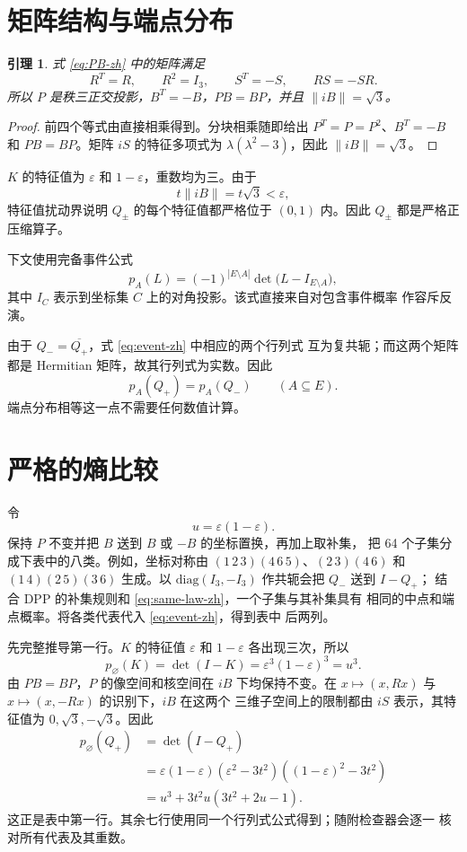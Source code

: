 \documentclass[UTF8,11pt,a4paper]{ctexart}
\newtheorem{lemma}{引理}
\begin{document}
\section{矩阵结构与端点分布}

\begin{lemma}\label{lem:structure-zh}
式 \eqref{eq:PB-zh} 中的矩阵满足
\[
 R^T=R,\qquad R^2=I_3,\qquad
 S^T=-S,\qquad RS=-SR.
\]
所以 $P$ 是秩三正交投影，$B^T=-B$，$PB=BP$，并且
$\lVert iB\rVert=\sqrt3$。
\end{lemma}

\begin{proof}
前四个等式由直接相乘得到。分块相乘随即给出
$P^T=P=P^2$、$B^T=-B$ 和 $PB=BP$。矩阵 $iS$ 的特征多项式为
$\lambda(\lambda^2-3)$，因此 $\lVert iB\rVert=\sqrt3$。
\end{proof}

$K$ 的特征值为 $\varepsilon$ 和 $1-\varepsilon$，重数均为三。由于
\[
 t\lVert iB\rVert=t\sqrt3<\varepsilon,
\]
特征值扰动界说明 $Q_\pm$ 的每个特征值都严格位于 $(0,1)$ 内。因此
$Q_\pm$ 都是严格正压缩算子。

下文使用完备事件公式
\begin{equation}\label{eq:event-zh}
 p_A(L)=(-1)^{|E\setminus A|}
 \det\bigl(L-I_{E\setminus A}\bigr),
\end{equation}
其中 $I_C$ 表示到坐标集 $C$ 上的对角投影。该式直接来自对包含事件概率
作容斥反演。

由于 $Q_-=\overline{Q_+}$，式 \eqref{eq:event-zh} 中相应的两个行列式
互为复共轭；而这两个矩阵都是 Hermitian 矩阵，故其行列式为实数。因此
\begin{equation}\label{eq:same-law-zh}
 p_A(Q_+)=p_A(Q_-)\qquad(A\subseteq E).
\end{equation}
端点分布相等这一点不需要任何数值计算。

\section{严格的熵比较}

令
\[
 u=\varepsilon(1-\varepsilon).
\]
保持 $P$ 不变并把 $B$ 送到 $B$ 或 $-B$ 的坐标置换，再加上取补集，
把 64 个子集分成下表中的八类。例如，坐标对称由
$(1\,2\,3)(4\,6\,5)$、$(2\,3)(4\,6)$ 和
$(1\,4)(2\,5)(3\,6)$ 生成。以
$\mathrm{diag}(I_3,-I_3)$ 作共轭会把 $Q_-$ 送到 $I-Q_+$；
结合 DPP 的补集规则和 \eqref{eq:same-law-zh}，一个子集与其补集具有
相同的中点和端点概率。将各类代表代入 \eqref{eq:event-zh}，得到表中
后两列。

先完整推导第一行。$K$ 的特征值 $\varepsilon$ 和 $1-\varepsilon$
各出现三次，所以
\[
 p_{\varnothing}(K)=\det(I-K)
 =\varepsilon^3(1-\varepsilon)^3=u^3.
\]
由 $PB=BP$，$P$ 的像空间和核空间在 $iB$ 下均保持不变。在
$x\mapsto(x,Rx)$ 与 $x\mapsto(x,-Rx)$ 的识别下，$iB$ 在这两个
三维子空间上的限制都由 $iS$ 表示，其特征值为
$0,\sqrt3,-\sqrt3$。因此
\begin{align*}
 p_{\varnothing}(Q_+)
 &=\det(I-Q_+)\\
 &=\varepsilon(1-\varepsilon)
   (\varepsilon^2-3t^2)((1-\varepsilon)^2-3t^2)\\
 &=u^3+3t^2u(3t^2+2u-1).
\end{align*}
这正是表中第一行。其余七行使用同一个行列式公式得到；随附检查器会逐一
核对所有代表及其重数。
\end{document}
